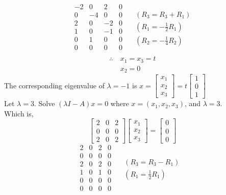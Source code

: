 \documentclass{article}
\begin{document}
$$
\begin{array}{rrr|r}
-2 & 0 & 2 & 0 \\
0 & -4 & 0 & 0 \\
2 & 0 & -2 & 0 \\
\hline
1 & 0 & -1 & 0 \\
0 & 1 & 0 & 0 \\
0 & 0 & 0 & 0 \\
\end{array}
\quad 
\begin{aligned}
(R_3 = R_3 + R_1)\\
(R_1 = -\frac{1}{2}R_1)\\
(R_2 = -\frac{1}{4}R_2)
\end{aligned}
$$
$$
\begin{aligned}
\therefore \ &x_1 = x_3 = t \\ 
&x_2 = 0
\end{aligned}
$$
The corresponding eigenvalue of $\lambda = -1$ is 
$x = \begin{bmatrix}x_1 \\ x_2 \\ x_3 \end{bmatrix} = t\begin{bmatrix}1 \\ 0 \\ 1 \end{bmatrix}$ 
\\
Let $\lambda = 3$. Solve $(\lambda I - A)x = 0$ where $x = (x_1, x_2, x_3)$, and $\lambda = 3$. \\
Which is,  
$$
\begin{bmatrix}
2 & 0 & 2 \\
0 & 0 & 0 \\
2 & 0 & 2
\end{bmatrix}
\begin{bmatrix}
x_1 \\
x_2 \\
x_3 
\end{bmatrix}=
\begin{bmatrix}
0 \\
0 \\
0
\end{bmatrix}
$$
$$
\begin{array}{rrr|r}
2 & 0 & 2 & 0 \\
0 & 0 & 0 & 0 \\
2 & 0 & 2 & 0 \\
\hline
1 & 0 & 1 & 0 \\
0 & 0 & 0 & 0 \\
0 & 0 & 0 & 0 \\
\end{array}
\quad
\begin{aligned}
    (R_3 = R_3 - R_1)& \\
    (R_1 = \frac{1}{2}R_1)
\end{aligned}
$$
\end{document}
